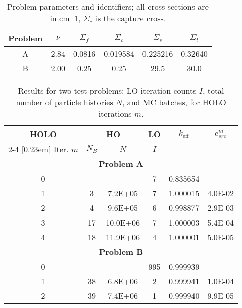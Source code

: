 \documentclass[10pt,twocolumn,pdftex,superscriptaddress]{anstrans}
\newcommand{\keff}{\ensuremath{k_{\text{eff}}}}
\newcommand{\sig}[1]{\ensuremath{\Sigma_{#1}}}
\begin{document}

    

\setlength{\tabcolsep}{3pt}
\begin{table}[ht!] \center
    \caption{Problem parameters and identifiers; all cross sections are in cm$^-1$,
        $\Sigma_c$ is the capture cross. \label{problems}}
  \begin{center}
  \hspace{-0.1in}
  \begin{tabular}{cccccc}
       \hline Problem & $\nu$ & $\sig f$ & $\sig c$ & $\sig s$ &  \sig t  \\
       \hline  A & 2.84 & 0.0816 & 0.019584 & 0.225216 & 0.32640  \\
               B & 2.00 & 0.25     & 0.25     & 29.5     & 30.0      \\
       \hline  
  \end{tabular}
  \end{center}
\end{table}
\setlength{\tabcolsep}{5pt}
\begin{table}[ht!] \center
    \caption{Results for two test problems: LO iteration counts $I$, total number of
        particle histories $N$, and MC batches, for HOLO iterations $m$.
 \label{k1}}
  \vspace{0.15in}
  \begin{center}
  \hspace{-0.1151in}
  \begin{tabular}{|c|cc|c|cc|}
      \hline \multirow{1}{*}[-0.24em]{HOLO} & \multicolumn{2}{|c|}{HO} &
      \multicolumn{1}{|c|}{LO} & \multirow{2}{*}{\keff} & \multirow{2}{*}{$e_{src}^{m}$} \\
      \cline{2-4} \multirow{1}{*}[0.23em]{ Iter. $m$} & $N_B$ & $N$ & $I$ & & \\ \hline \hline
      \multicolumn{6}{|c|}{\textbf{Problem A}} \\ \hline
      0 & - & -         &7 &    0.835654 & - \\
      1 & 3 & 7.2E+05   &7 &    1.000015 & 4.0E-02  \\
      2 & 4  & 9.6E+05  &6 &   0.998877 & 2.9E-03 \\
      3 & 17 & 10.0E+06 &7 &  1.000003 & 5.4E-04 \\
      4 & 18 & 11.9E+06 &4 &  1.000001 & 5.0E-05 \\ \hline \hline
      \multicolumn{6}{|c|}{\textbf{Problem B}} \\ \hline
      0 & - & -         & 995 &    0.999939 & - \\
      1 & 38 & 6.8E+06  & 2   &   0.999941 & 1.0E-04  \\
      2 & 39 & 7.4E+06  & 1   &   0.999940 & 9.9E-05 \\ \hline
  \end{tabular}
  \end{center}
\end{table}
\end{document}
